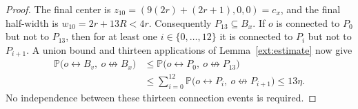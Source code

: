 \begin{proof}
The final center is
$z_{10}=(9(2r)+(2r+1),0,0)=c_x$, and the final half-width is
$w_{10}=2r+13R<4r$. Consequently $P_{13}\subseteq B_x$. If $o$ is connected
to $P_0$ but not to $P_{13}$, then for at least one $i\in\{0,\ldots,12\}$
it is connected to $P_i$ but not to $P_{i+1}$. A union bound and thirteen
applications of Lemma~\ref{ext:estimate} now give
\[
\begin{split}
  \mathbb P\bigl(o\leftrightarrow B_v,\ o\not\leftrightarrow B_x\bigr)
  &\le
  \mathbb P\bigl(o\leftrightarrow P_0,\ o\not\leftrightarrow P_{13}\bigr)\\
  &\le \sum_{i=0}^{12}
       \mathbb P\bigl(o\leftrightarrow P_i,\ o\not\leftrightarrow P_{i+1}\bigr)
   \le 13\eta.
\end{split}
\]
No independence between these thirteen connection events is required.
\end{proof}
